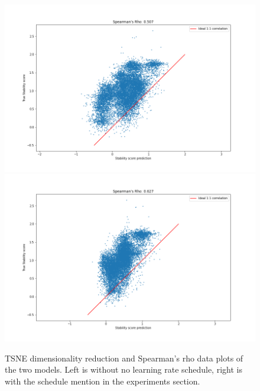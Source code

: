 \begin{figure}[!ht]
  \includegraphics[width=0.49\linewidth]{latex/imgs/spearman_1_layer_with_schedule_1024_final.png}
  \includegraphics[width=0.49\linewidth]{latex/imgs/spearman_1_layer_with_schedule_1024_minloss.png}
  \caption{TSNE dimensionality reduction  and Spearman's rho data plots of the two models. Left is without no learning rate schedule, right is with the schedule mention in the experiments section.}
\end{figure}

